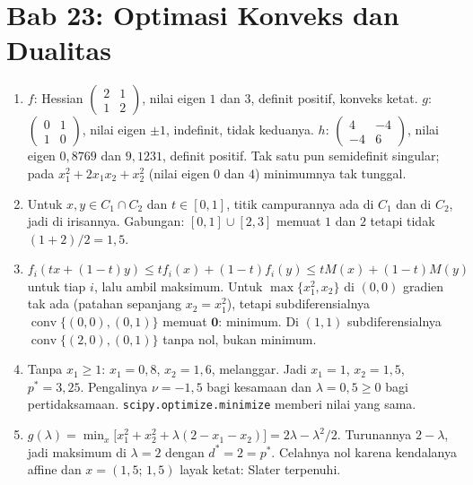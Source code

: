 \section*{Bab 23: Optimasi Konveks dan Dualitas}
\begin{enumerate}[label=\textbf{23.\arabic*}]
  \item $f$: Hessian $\begin{pmatrix}2&1\\1&2\end{pmatrix}$, nilai eigen $1$ dan $3$,
        definit positif, konveks ketat. $g$: $\begin{pmatrix}0&1\\1&0\end{pmatrix}$,
        nilai eigen $\pm1$, indefinit, tidak keduanya. $h$:
        $\begin{pmatrix}4&-4\\-4&6\end{pmatrix}$, nilai eigen $0{,}8769$ dan $9{,}1231$,
        definit positif. Tak satu pun semidefinit singular; pada $x_{1}^{2}+2x_{1}x_{2}
        +x_{2}^{2}$ (nilai eigen $0$ dan $4$) minimumnya tak tunggal.

  \item Untuk $x,y\in C_{1}\cap C_{2}$ dan $t\in[0,1]$, titik campurannya ada di
        $C_{1}$ dan di $C_{2}$, jadi di irisannya. Gabungan: $[0,1]\cup[2,3]$ memuat
        $1$ dan $2$ tetapi tidak $(1+2)/2=1{,}5$.

  \item $f_{i}(tx+(1-t)y)\le tf_{i}(x)+(1-t)f_{i}(y)\le tM(x)+(1-t)M(y)$ untuk tiap
        $i$, lalu ambil maksimum. Untuk $\max\{x_{1}^{2},x_{2}\}$ di $(0,0)$ gradien
        tak ada (patahan sepanjang $x_{2}=x_{1}^{2}$), tetapi subdiferensialnya
        $\operatorname{conv}\{(0,0),(0,1)\}$ memuat $\mathbf{0}$: minimum. Di $(1,1)$
        subdiferensialnya $\operatorname{conv}\{(2,0),(0,1)\}$ tanpa nol, bukan minimum.

  \item Tanpa $x_{1}\ge1$: $x_{1}=0{,}8$, $x_{2}=1{,}6$, melanggar. Jadi $x_{1}=1$,
        $x_{2}=1{,}5$, $p^{*}=3{,}25$. Pengalinya $\nu=-1{,}5$ bagi kesamaan dan
        $\lambda=0{,}5\ge0$ bagi pertidaksamaan. \texttt{scipy.optimize.mini\-mize}
        memberi nilai yang sama.

  \item $g(\lambda)=\min_{x}\bigl[x_{1}^{2}+x_{2}^{2}+\lambda(2-x_{1}-x_{2})\bigr]
        =2\lambda-\lambda^{2}/2$. Turunannya $2-\lambda$, jadi maksimum di $\lambda=2$
        dengan $d^{*}=2=p^{*}$. Celahnya nol karena kendalanya affine dan
        $x=(1{,}5;\,1{,}5)$ layak ketat: Slater terpenuhi.


\end{enumerate}
